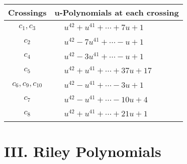 \documentclass[1p]{elsarticle_modified}
\theoremstyle{definition}
\begin{document}
\begin{tabular}{m{50pt}|m{274pt}}
Crossings & \hspace{64pt}u-Polynomials at each crossing \\
\hline $$\begin{aligned}c_{1},c_{3}\end{aligned}$$&$\begin{aligned}
&u^{42}+u^{41}+\cdots+7 u+1
\end{aligned}$\\
\hline $$\begin{aligned}c_{2}\end{aligned}$$&$\begin{aligned}
&u^{42}-7 u^{41}+\cdots- u+1
\end{aligned}$\\
\hline $$\begin{aligned}c_{4}\end{aligned}$$&$\begin{aligned}
&u^{42}-3 u^{41}+\cdots- u+1
\end{aligned}$\\
\hline $$\begin{aligned}c_{5}\end{aligned}$$&$\begin{aligned}
&u^{42}+u^{41}+\cdots+37 u+17
\end{aligned}$\\
\hline $$\begin{aligned}c_{6},c_{9},c_{10}\end{aligned}$$&$\begin{aligned}
&u^{42}- u^{41}+\cdots-3 u+1
\end{aligned}$\\
\hline $$\begin{aligned}c_{7}\end{aligned}$$&$\begin{aligned}
&u^{42}- u^{41}+\cdots-10 u+4
\end{aligned}$\\
\hline $$\begin{aligned}c_{8}\end{aligned}$$&$\begin{aligned}
&u^{42}+u^{41}+\cdots+21 u+1
\end{aligned}$\\
\hline
\end{tabular}\newpage\renewcommand{\arraystretch}{1}
\centering \section*{ III. Riley Polynomials}
\end{document}
